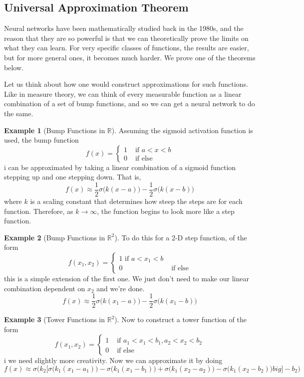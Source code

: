 \documentclass{article}
\theoremstyle{definition}
\newtheorem{example}{Example}[section]
\theoremstyle{remark}
\theoremstyle{definition}
\begin{document}
  \subsection{Universal Approximation Theorem} 

    Neural networks have been mathematically studied back in the 1980s, and the reason that they are so powerful is that we can theoretically prove the limits on what they can learn. For very specific classes of functions, the results are easier, but for more general ones, it becomes much harder. We prove one of the theorems below. 

    Let us think about how one would construct approximations for such functions. Like in measure theory, we can think of every measurable function as a linear combination of a set of bump functions, and so we can get a neural network to do the same.

    \begin{example}[Bump Functions in $\mathbb{R}$] 
      Assuming the sigmoid activation function is used, the bump function 
        \[f(x) = \begin{cases} 1 & \text{ if } a < x < b \\ 0 & \text{ if else} \end{cases}\]i
      can be approximated by taking a linear combination of a sigmoid function stepping up and one stepping down. That is, 
        \[f(x) \approx \frac{1}{2} \sigma \big( k( x - a)\big) - \frac{1}{2} \sigma \big( k (x - b) \big)\]
      where $k$ is a scaling constant that determines how steep the steps are for each function. Therefore, as $k \rightarrow \infty$, the function begins to look more like a step function. 
    \end{example}

    \begin{example}[Bump Functions in $\mathbb{R}^2$]
      To do this for a 2-D step function, of the form 
        \[f(x_1, x_2) = \begin{cases} 1 \text{ if } a < x_1 < b \\ 0 & \text{ if else} \end{cases}\]
      this is a simple extension of the first one. We just don't need to make our linear combination dependent on $x_2$ and we're done.
        \[f(x) \approx \frac{1}{2} \sigma \big( k( x_1 - a)\big) - \frac{1}{2} \sigma \big( k (x_1 - b) \big)\]
    \end{example} 

    \begin{example}[Tower Functions in $\mathbb{R}^2$] 
      Now to construct a tower function of the form 
        \[f(x_1, x_2) = \begin{cases} 1 & \text{ if } a_1 < x_1 < b_1, a_2 < x_2 < b_2 \\ 0 & \text{ if else} \end{cases}\]i
      we need slightly more creativity. Now we can approximate it by doing 
        \[f(x) \approx \sigma \bigg( k_2 \big[ \sigma\big( k_1 (x_1 - a_1)\big) - \sigma\big( k_1 (x_1 -b_1)\big) + \sigma \big( k_1 (x_2 - a_2)\big) - \sigma\big(k_1 (x_2 - b_2)\big)  big] - b_2\bigg)\]
    \end{example} 
\end{document}
